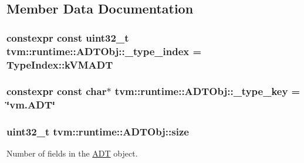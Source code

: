\subsection{Member Data Documentation}
\subsubsection[{\texorpdfstring{\+\_\+type\+\_\+index}{_type_index}}]{\setlength{\rightskip}{0pt plus 5cm}constexpr const uint32\+\_\+t tvm\+::runtime\+::\+A\+D\+T\+Obj\+::\+\_\+type\+\_\+index = Type\+Index\+::k\+V\+M\+A\+DT\hspace{0.3cm}{\ttfamily [static]}}\hypertarget{classtvm_1_1runtime_1_1ADTObj_ae35ebc3d49a7264ac1ed16a80472347f}{}\label{classtvm_1_1runtime_1_1ADTObj_ae35ebc3d49a7264ac1ed16a80472347f}
\subsubsection[{\texorpdfstring{\+\_\+type\+\_\+key}{_type_key}}]{\setlength{\rightskip}{0pt plus 5cm}constexpr const char$\ast$ tvm\+::runtime\+::\+A\+D\+T\+Obj\+::\+\_\+type\+\_\+key = \char`\"{}vm.\+A\+DT\char`\"{}\hspace{0.3cm}{\ttfamily [static]}}\hypertarget{classtvm_1_1runtime_1_1ADTObj_ab083e5c0b35f64b668eaf5cfb0f98098}{}\label{classtvm_1_1runtime_1_1ADTObj_ab083e5c0b35f64b668eaf5cfb0f98098}
\subsubsection[{\texorpdfstring{size}{size}}]{\setlength{\rightskip}{0pt plus 5cm}uint32\+\_\+t tvm\+::runtime\+::\+A\+D\+T\+Obj\+::size}\hypertarget{classtvm_1_1runtime_1_1ADTObj_a699d898a036382a0c86fba219bcf8102}{}\label{classtvm_1_1runtime_1_1ADTObj_a699d898a036382a0c86fba219bcf8102}


Number of fields in the \hyperlink{classtvm_1_1runtime_1_1ADT}{A\+DT} object. 


